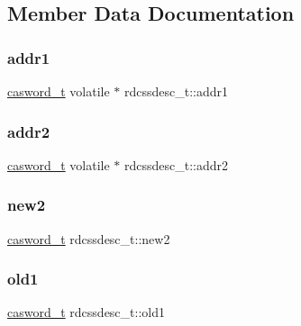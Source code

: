 \subsection{Member Data Documentation}
\mbox{\label{structrdcssdesc__t_ab47535b838f7a74d99e96738a42d204c}} 
\subsubsection{\texorpdfstring{addr1}{addr1}}
{\footnotesize\ttfamily \hyperlink{rq__unsafe_8h_ad45142aaf2ff20a036dc6242b8483e9c}{casword\+\_\+t} volatile $\ast$ rdcssdesc\+\_\+t\+::addr1}

\mbox{\label{structrdcssdesc__t_afe6e31e7b7fea3b440994e84eba9c802}} 
\subsubsection{\texorpdfstring{addr2}{addr2}}
{\footnotesize\ttfamily \hyperlink{rq__unsafe_8h_ad45142aaf2ff20a036dc6242b8483e9c}{casword\+\_\+t} volatile $\ast$ rdcssdesc\+\_\+t\+::addr2}

\mbox{\label{structrdcssdesc__t_ac49ae2fc71c98669baafb8140b84b65a}} 
\subsubsection{\texorpdfstring{new2}{new2}}
{\footnotesize\ttfamily \hyperlink{rq__unsafe_8h_ad45142aaf2ff20a036dc6242b8483e9c}{casword\+\_\+t} rdcssdesc\+\_\+t\+::new2}

\mbox{\label{structrdcssdesc__t_a719fca618bebcab487aae8512a2b0f79}} 
\subsubsection{\texorpdfstring{old1}{old1}}
{\footnotesize\ttfamily \hyperlink{rq__unsafe_8h_ad45142aaf2ff20a036dc6242b8483e9c}{casword\+\_\+t} rdcssdesc\+\_\+t\+::old1}

